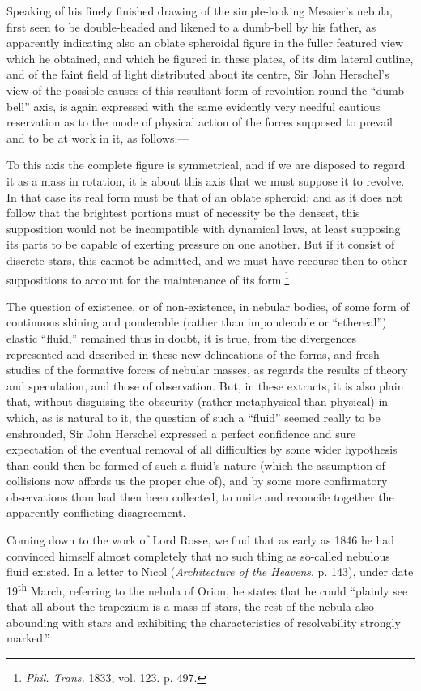 \documentclass[a4paper, 12pt, oneside, polutonikogreek, english]{article}
\begin{document}
Speaking of his finely finished drawing of the simple-looking Messier's nebula, first seen to be double-headed and likened to a dumb-bell by his father, as apparently indicating also an oblate spheroidal figure in the fuller featured view which he obtained, and which he figured in these plates, of its dim lateral outline, and of the faint field of light distributed about its centre, Sir John Herschel's view of the possible causes of this resultant form of revolution round the ``dumb-bell'' axis, is again expressed with the same evidently very needful cautious reservation as to the mode of physical action of the forces supposed to prevail and to be at work in it, as follows:---

To this axis the complete figure is symmetrical, and if we are disposed to regard it as a mass in rotation, it is about this axis that we must suppose it to revolve. In that case its real form must be that of an oblate spheroid; and as it does not follow that the brightest portions must of necessity be the densest, this supposition would not be incompatible with dynamical laws, at least supposing its parts to be capable of exerting pressure on one another. But if it consist of discrete stars, this cannot be admitted, and we must have recourse then to other suppositions to account for the maintenance of its form.\footnote{\emph{Phil. Trans.} 1833, vol. 123. p. 497.}

The question of existence, or of non-existence, in nebular bodies, of some form of continuous shining and ponderable (rather than imponderable or ``ethereal'') elastic ``fluid,'' remained thus in doubt, it is true, from the divergences represented and described in these new delineations of the forms, and fresh studies of the formative forces of nebular masses, as regards the results of theory and speculation, and those of observation. But, in these extracts, it is also plain that, without disguising the obscurity (rather metaphysical than physical) in which, as is natural to it, the question of such a ``fluid'' seemed really to be enshrouded, Sir John Herschel expressed a perfect confidence and sure expectation of the eventual removal of all difficulties by some wider hypothesis than could then be formed of such a fluid's nature (which the assumption of collisions now affords us the proper clue of), and by some more confirmatory observations than had then been collected, to unite and reconcile together the apparently conflicting disagreement.

Coming down to the work of Lord Rosse, we find that as early as 1846 he had convinced himself almost completely that no such thing as so-called nebulous fluid existed. In a letter to Nicol (\emph{Architecture of the Heavens}, p. 143), under date 19\textsuperscript{th} March, referring to the nebula of Orion, he states that he could ``plainly see that all about the trapezium is a mass of stars, the rest of the nebula also abounding with stars and exhibiting the characteristics of resolvability strongly marked.''
\end{document}
